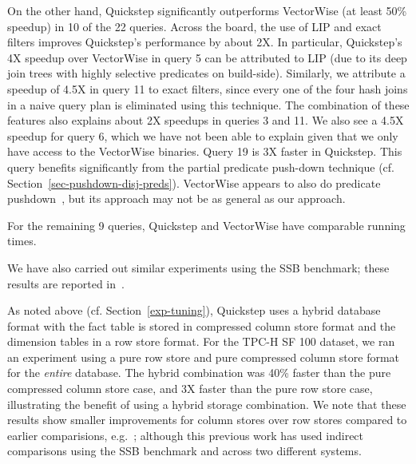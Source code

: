 On the other hand, Quickstep significantly outperforms VectorWise (at least 50\% speedup) in 10 of the 22 queries. Across the board, the use of LIP and exact filters improves Quickstep's performance by about 2X. In particular, Quickstep's 4X speedup over VectorWise in query 5 can be attributed to LIP (due to its deep join trees with highly selective predicates on build-side). Similarly, we attribute a speedup of 4.5X in query 11 to exact filters, since every one of the four hash joins in a naive query plan is eliminated using this technique. The combination of these features also explains about 2X speedups in queries 3 and 11. We also see a 4.5X speedup for query 6, which we have not been able to explain given that we only have access to the VectorWise binaries. Query 19 is 3X faster in Quickstep. This query benefits significantly from the partial predicate push-down technique  (cf. Section~\ref{sec-pushdown-disj-preds}). VectorWise appears to also do predicate pushdown~\cite{BonczNE13}, but its approach may not be as general as our approach.

For the remaining 9 queries, Quickstep and VectorWise have comparable running times.

We have also carried out similar experiments using the SSB benchmark; these results are reported in~\cite{patel1quickstep}.

As noted above (cf. Section~\ref{exp-tuning}), Quickstep uses a hybrid database format with the fact table is stored in compressed column store format and the dimension tables in a row store format. For the TPC-H SF 100 dataset, we ran an experiment using a pure row store and pure compressed column store format for the \textit{entire} database. The hybrid combination was 40\% faster than the pure compressed column store case, and 3X faster than the pure row store case, illustrating the benefit of using a hybrid storage combination. We note that these results show smaller improvements for column stores over row stores compared to earlier comparisions, e.g.~\cite{AbadiMH08}; although this previous work has used indirect comparisons using the SSB benchmark and across two different systems.


